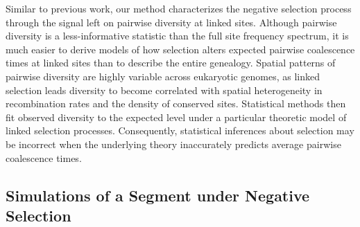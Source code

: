 \documentclass[11pt]{article}
\begin{document}
Similar to previous work, our method characterizes the negative selection
process through the signal left on pairwise diversity at linked sites. Although
pairwise diversity is a less-informative statistic than the full site frequency
spectrum, it is much easier to derive models of how selection alters expected
pairwise coalescence times at linked sites than to describe the entire
genealogy. Spatial patterns of pairwise diversity are highly variable across
eukaryotic genomes, as linked selection leads diversity to become correlated
with spatial heterogeneity in recombination rates and the density of conserved
sites. Statistical methods then fit observed diversity to the expected level
under a particular theoretic model of linked selection processes. Consequently,
statistical inferences about selection may be incorrect when the underlying
theory inaccurately predicts average pairwise coalescence times.

\subsection*{Simulations of a Segment under Negative Selection}
\end{document}
